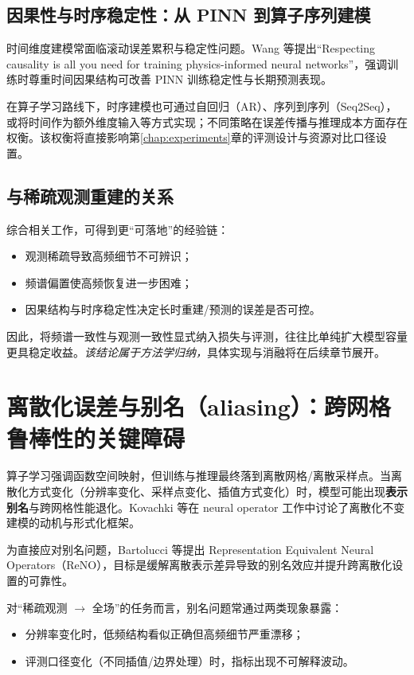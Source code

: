 \subsection{因果性与时序稳定性：从 PINN 到算子序列建模}\label{subsec:rw_causality}

时间维度建模常面临滚动误差累积与稳定性问题。Wang 等提出“Respecting causality is all you need for training physics-informed neural networks”，强调训练时尊重时间因果结构可改善 PINN 训练稳定性与长期预测表现\cite{wang2022causality_pinn}。

在算子学习路线下，时序建模也可通过自回归（AR）、序列到序列（Seq2Seq），或将时间作为额外维度输入等方式实现；不同策略在误差传播与推理成本方面存在权衡。该权衡将直接影响第\ref{chap:experiments}章的评测设计与资源对比口径设置。


\subsection{与稀疏观测重建的关系}\label{subsec:rw_relation}

综合相关工作，可得到更“可落地”的经验链：
\begin{itemize}
  \item 观测稀疏导致高频细节不可辨识；
  \item 频谱偏置使高频恢复进一步困难；
  \item 因果结构与时序稳定性决定长时重建/预测的误差是否可控。
\end{itemize}

因此，将频谱一致性与观测一致性显式纳入损失与评测，往往比单纯扩大模型容量更具稳定收益。\emph{该结论属于方法学归纳，}具体实现与消融将在后续章节展开。


\section{离散化误差与别名（aliasing）：跨网格鲁棒性的关键障碍}\label{sec:rw_aliasing}

算子学习强调函数空间映射，但训练与推理最终落到离散网格/离散采样点。当离散化方式变化（分辨率变化、采样点变化、插值方式变化）时，模型可能出现\textbf{表示别名}与跨网格性能退化。Kovachki 等在 neural operator 工作中讨论了离散化不变建模的动机与形式化框架\cite{kovachki2023neural_operator}。

为直接应对别名问题，Bartolucci 等提出 Representation Equivalent Neural Operators（ReNO），目标是缓解离散表示差异导致的别名效应并提升跨离散化设置的可靠性\cite{bartolucci2023reno}。

对“稀疏观测 $\rightarrow$ 全场”的任务而言，别名问题常通过两类现象暴露：
\begin{itemize}
  \item 分辨率变化时，低频结构看似正确但高频细节严重漂移；
  \item 评测口径变化（不同插值/边界处理）时，指标出现不可解释波动。
\end{itemize}

